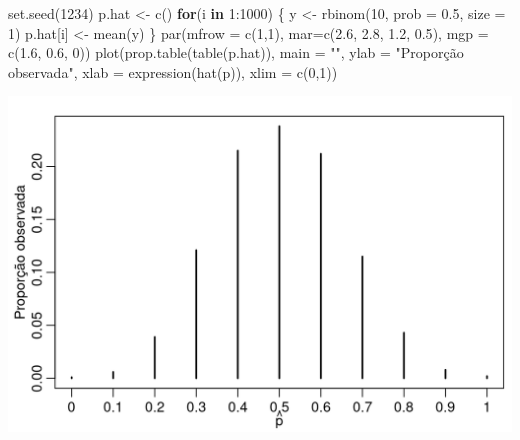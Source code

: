 \documentclass[
  10pt,
  a4paper]{book}
\newenvironment{Shaded}{\begin{snugshade}}{\end{snugshade}}
\newcommand{\AttributeTok}[1]{\textcolor[rgb]{0.77,0.63,0.00}{#1}}
\newcommand{\ControlFlowTok}[1]{\textcolor[rgb]{0.13,0.29,0.53}{\textbf{#1}}}
\newcommand{\DecValTok}[1]{\textcolor[rgb]{0.00,0.00,0.81}{#1}}
\newcommand{\FloatTok}[1]{\textcolor[rgb]{0.00,0.00,0.81}{#1}}
\newcommand{\FunctionTok}[1]{\textcolor[rgb]{0.00,0.00,0.00}{#1}}
\newcommand{\NormalTok}[1]{#1}
\newcommand{\OtherTok}[1]{\textcolor[rgb]{0.56,0.35,0.01}{#1}}
\newcommand{\SpecialCharTok}[1]{\textcolor[rgb]{0.00,0.00,0.00}{#1}}
\newcommand{\StringTok}[1]{\textcolor[rgb]{0.31,0.60,0.02}{#1}}
\begin{document}
\begin{Shaded}
\begin{Highlighting}[]
\FunctionTok{set.seed}\NormalTok{(}\DecValTok{1234}\NormalTok{)}
\NormalTok{p.hat }\OtherTok{\textless{}{-}} \FunctionTok{c}\NormalTok{()}
\ControlFlowTok{for}\NormalTok{(i }\ControlFlowTok{in} \DecValTok{1}\SpecialCharTok{:}\DecValTok{1000}\NormalTok{) \{}
\NormalTok{  y }\OtherTok{\textless{}{-}} \FunctionTok{rbinom}\NormalTok{(}\DecValTok{10}\NormalTok{, }\AttributeTok{prob =} \FloatTok{0.5}\NormalTok{, }\AttributeTok{size =} \DecValTok{1}\NormalTok{)}
\NormalTok{  p.hat[i] }\OtherTok{\textless{}{-}} \FunctionTok{mean}\NormalTok{(y)}
\NormalTok{\}}
\FunctionTok{par}\NormalTok{(}\AttributeTok{mfrow =} \FunctionTok{c}\NormalTok{(}\DecValTok{1}\NormalTok{,}\DecValTok{1}\NormalTok{), }\AttributeTok{mar=}\FunctionTok{c}\NormalTok{(}\FloatTok{2.6}\NormalTok{, }\FloatTok{2.8}\NormalTok{, }\FloatTok{1.2}\NormalTok{, }\FloatTok{0.5}\NormalTok{), }\AttributeTok{mgp =} \FunctionTok{c}\NormalTok{(}\FloatTok{1.6}\NormalTok{, }\FloatTok{0.6}\NormalTok{, }\DecValTok{0}\NormalTok{))}
\FunctionTok{plot}\NormalTok{(}\FunctionTok{prop.table}\NormalTok{(}\FunctionTok{table}\NormalTok{(p.hat)), }\AttributeTok{main =} \StringTok{""}\NormalTok{, }
     \AttributeTok{ylab =} \StringTok{"Proporção observada"}\NormalTok{,}
     \AttributeTok{xlab =} \FunctionTok{expression}\NormalTok{(}\FunctionTok{hat}\NormalTok{(p)), }\AttributeTok{xlim =} \FunctionTok{c}\NormalTok{(}\DecValTok{0}\NormalTok{,}\DecValTok{1}\NormalTok{))}
\end{Highlighting}
\end{Shaded}

\begin{center}\includegraphics{figures/unnamed-chunk-387-1} \end{center}
\end{document}
